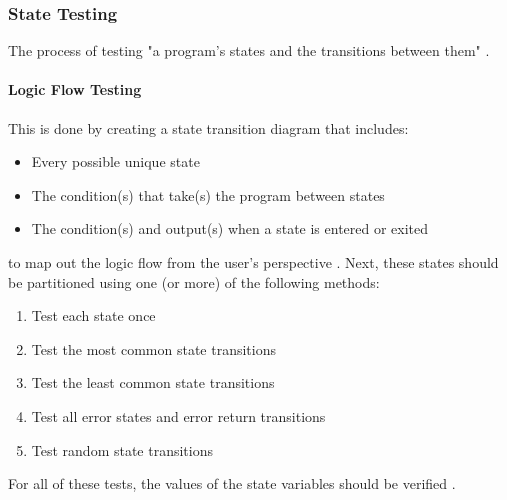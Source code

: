 \subsubsection{State Testing \cite[p.~79-87]{patton_software_2006}}

The process of testing "a program's states and the transitions between them"
\cite[p.~79]{patton_software_2006}.

\paragraph{Logic Flow Testing \cite[p.~80-84]{patton_software_2006}}

This is done by creating a state transition diagram that includes:

\begin{itemize}
      \item Every possible unique state
      \item The condition(s) that take(s) the program between states
      \item The condition(s) and output(s) when a state is entered or exited
\end{itemize}

to map out the logic flow from the user's perspective
\cite[p.~81-82]{patton_software_2006}. Next, these states should be
partitioned using one (or more) of the following methods:

\begin{enumerate}
      \item Test each state once
      \item Test the most common state transitions
      \item Test the least common state transitions
      \item Test all error states and error return transitions
      \item Test random state transitions
            \cite[p.~82-83]{patton_software_2006}
\end{enumerate}

For all of these tests, the values of the state variables should be verified
\cite[p.~83]{patton_software_2006}.

